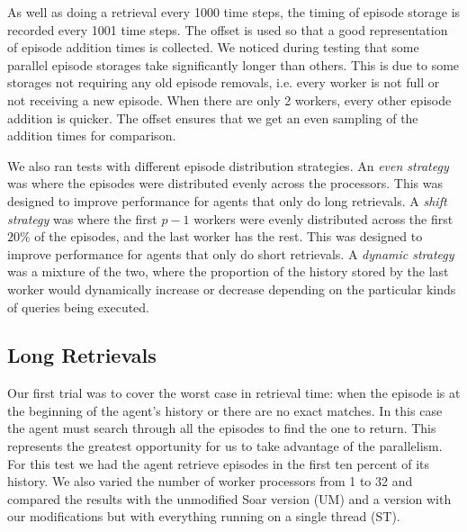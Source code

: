 \documentclass[11pt]{article} %
\begin{document}
As well as doing a retrieval every 1000 time steps, the timing of episode
storage is recorded every 1001 time steps. The offset is used so that a good
representation of episode addition times is collected. We noticed during testing
that some parallel episode storages take significantly longer than others. This
is due to some storages not requiring any old episode removals, i.e. every worker
is not full or not receiving a new episode. When there are only 2 workers, every
other episode addition is quicker. The offset ensures that we get an even
sampling of the addition times for comparison.

We also ran tests with different episode distribution strategies. An \emph{even strategy} was
where the episodes were distributed evenly across the processors. This was designed to
improve performance for agents that only do long retrievals. A \emph{shift strategy} was
where the first $p-1$ workers were evenly distributed across the first $20\%$ of the episodes, and 
the last worker has the rest. This was designed to improve performance for agents that only do
short retrievals. A \emph{dynamic strategy} was a mixture of the two, where the proportion of the 
history stored by the last worker would dynamically increase or decrease depending on the particular
kinds of queries being executed. 


\subsection{Long Retrievals}
Our first trial was to cover the worst case in retrieval time: when the episode is at the beginning of 
the agent's history or there are no exact matches. In this case the agent must search through all 
the episodes to find the one to return. This represents the greatest opportunity for us to take advantage 
of the parallelism. For this test we had the agent retrieve episodes in the first ten percent of its history. 
We also varied the number of worker processors from 1 to 32 and compared the results with the unmodified 
Soar version (UM) and a version with our modifications but with everything running on a single thread (ST). 
\end{document}
